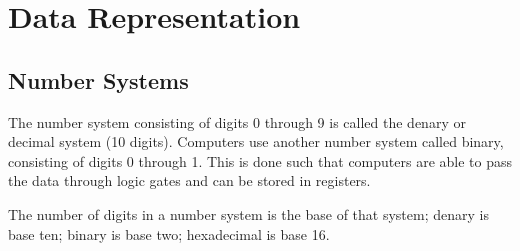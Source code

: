 \documentclass{article}
\begin{document}
\tableofcontents\newpage
\section {Data Representation}
\subsection{Number Systems}
The number system consisting of digits 0 through 9 is called the denary or decimal system
(10 digits). Computers use another number system called binary, consisting of digits
0 through 1. This is done such that computers are able to pass the data through logic 
gates and can be stored in registers.

The number of digits in a number system is the base of that system; denary is base ten;
binary is base two; hexadecimal is base 16.
\end{document}
